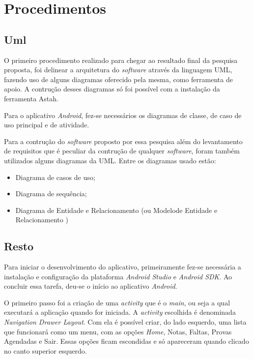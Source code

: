 \section{Procedimentos}
	
	\subsection{Uml}
	
			\par O primeiro procedimento realizado para chegar ao resultado final 
		da pesquisa proposta, foi delinear a arquitetura do \textit{software} através
		da linguagem UML, fazendo uso de alguns diagramas oferecido pela mesma, como
		ferramenta de apoio. A contrução desses diagramas só foi possível com a
		instalação da ferramenta Astah.
			
			\par Para o aplicativo \textit{Android}, fez-se necessários os diagramas de
		classe, de caso de uso principal e de atividade.
		
			\par Para a contrução do \textit{software} proposto por essa pesquisa além do
		levantamento de requisitos que é peculiar da contrução de qualquer
		\textit{software}, foram também utilizados alguns diagramas da UML. Entre os
		diagramas usado estão:
			\begin{itemize}
			  
			  \item Diagrama de casos de uso;
			  
			  \item Diagrama de sequência;
			  
			  \item Diagrama de Entidade e Relacionamento (ou Modelode Entidade e
			  Relacionamento )
			
			\end{itemize}
	
	
	\subsection{Resto}
	
		\par Para iniciar o desenvolvimento do aplicativo, primeiramente fez-se
	necessária a instalação e configuração da plataforma \textit{Android Studio} e
	\textit{Android SDK}. Ao concluir essa tarefa, deu-se o início ao aplicativo
	\textit{Android}.

		\par O primeiro passo foi a criação de uma \textit{activity} que é o
	\textit{main}, ou seja a qual executará a aplicação quando for iniciada.
	A \textit{activity} escolhida é denominada \textit{Navigation Drawer Layout}.
	Com ela é possível criar, do lado esquerdo, uma lista que funcionará como um
	menu, com as opções \textit{Home}, Notas, Faltas, Provas Agendadas e Sair.
	Essas opções ficam escondidas e só apareceram quando clicado no canto superior
	esquerdo.

